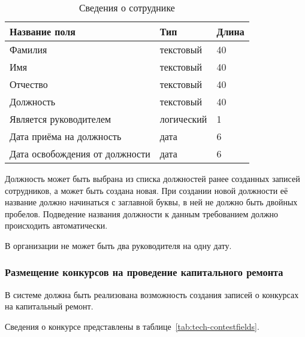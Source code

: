 \begin{footnotesize}
\begin{longtable}[h]{|p{}|p{}|p{}|}
	\caption{\label{tab:tech-employeefields}Сведения о сотруднике} \\
	\hline
		\textbf{Название поля} & \textbf{Тип} & \textbf{Длина} \\
	\hline \endhead
		Фамилия & текстовый & 40 \\
	\hline
		Имя & текстовый & 40 \\
	\hline
		Отчество & текстовый & 40 \\
	\hline
		Должность & текстовый & 40 \\
	\hline
		Является руководителем & логический & 1 \\
	\hline
		Дата приёма на должность & дата & 6 \\
	\hline
		Дата освобождения от должности & дата & 6 \\
	\hline
\end{longtable}
\end{footnotesize}

Должность может быть выбрана из списка должностей ранее созданных записей сотрудников, а может быть создана новая.
При создании новой должности её название должно начинаться с заглавной буквы, в ней не должно быть двойных пробелов.
Подведение названия должности к данным требованием должно происходить автоматически.

В организации не может быть два руководителя на одну дату.

\subsubsection{Размещение конкурсов на проведение капитального ремонта}

В системе должна быть реализована возможность создания записей о конкурсах на капитальный ремонт.

Сведения о конкурсе представлены в таблице~\ref{tab:tech-contestfields}.

